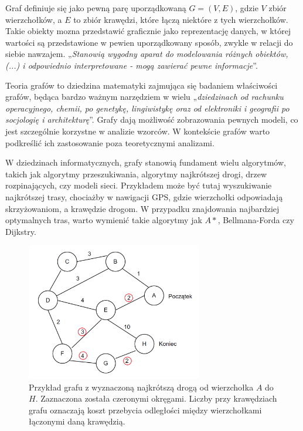 Graf definiuje się jako pewną parę uporządkowaną $G = (V, E)$, gdzie $V$ zbiór wierzchołków,
a $E$ to zbiór krawędzi, które łączą niektóre z tych wierzchołków.
Takie obiekty mozna przedstawić graficznie jako reprezentację danych,
w której wartości są przedstawione w pewien uporządkowany sposób, zwykle w relacji do siebie nawzajem.
„\textit{Stanowią wygodny aparat do modelowania różnych obiektów, (...) i odpowiednio interpretowane
- mogą zawierać pewne informacje}”\cite{Wloch2008}.

Teoria grafów to dziedzina matematyki zajmująca się badaniem właściwości grafów,
będąca bardzo ważnym narzędziem w wielu „\textit{dziedzinach od rachunku operacyjnego, chemii, po genetykę, lingiwistykę
oraz od elektroniki i geografii po socjologię i architekturę}”\cite{Wilson2012}.
Grafy dają możliwość zobrazowania pewnych modeli, co jest szczególnie korzystne w analizie wzorców.
W kontekście grafów warto podkreślić ich zastosowanie poza teoretycznymi analizami.

W dziedzinach informatycznych, grafy stanowią fundament wielu algorytmów, takich jak algorytmy przeszukiwania,
algorytmy najkrótszej drogi, drzew rozpinających, czy modeli sieci.
Przykładem może być tutaj wyszukiwanie najkrótszej trasy, chociażby w nawigacji GPS,
gdzie wierzchołki odpowiadają skrzyżowaniom, a krawędzie drogom.
W przypadku znajdowania najbardziej optymalnych tras, warto wymienić takie algorytmy jak $A*$, Bellmana-Forda czy Dijkstry.

\begin{figure}[ht]
	\centering
	\includegraphics[height=6cm]{partials/introduction/images/shortest_path.png}
	\caption{Przykład grafu z wyznaczoną najkrótszą drogą od wierzchołka $A$ do $H$.
		Zaznaczona została czeronymi okręgami.
		Liczby przy krawędziach grafu oznaczają koszt przebycia odległości między wierzchołkami łączonymi daną krawędzią.}
    \label{Fig:intro-1}
\end{figure}

